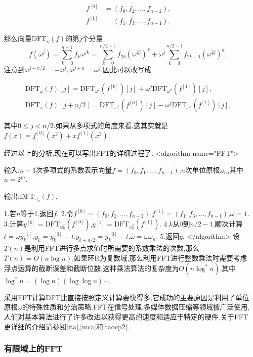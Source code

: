 \documentclass{ctexart}
\newcommand\mtcasCite[1]{[#1]}
\theoremstyle{remark}
\theoremstyle{definition}
\begin{document}
\begin{align*}
f^{[0]}&=(f_0,f_2,\ldots,f_{n-2}),\\
f^{[1]}&=(f_1,f_3,\ldots,f_{n-1}),
\end{align*}

那么向量$\mathrm{DFT}_\omega(f)$的第$j$个分量$$f(\omega^j)=\sum_{k=0}^{n-1}f_k\omega^{jk}=\sum_{k=0}^{n/2-1}f_{2k}(\omega^{2j})^k+\omega^j\sum_{k=0}^{n/2-1}f_{2k+1}(\omega^{2j})^k,$$注意到$\omega^{j+n/2}=-\omega^j,\omega^{j+n}=\omega^j$,因此可以改写成

\begin{align*}
\mathrm{DFT}_\omega(f)[j]=\mathrm{DFT}_{\omega^2}(f^{[0]})[j]+\omega^j\mathrm{DFT}_{\omega^2}(f^{[1]})[j],\\
\mathrm{DFT}_\omega(f)[j+n/2]=\mathrm{DFT}_{\omega^2}(f^{[0]})[j]-\omega^j\mathrm{DFT}_{\omega^2}(f^{[1]})[j],
\end{align*}

其中$0\le j<n/2$.如果从多项式的角度来看,这其实就是$f(x)=f^{[0]}(x^2)+xf^{[ 1]}(x^2)$.

经过以上的分析,现在可以写出FFT的详细过程了.
<algorithm  name="FFT">

输入:$n-1$次多项式的系数表示向量$f=(f_0,f_1,\ldots,f_{n-1})$,$n$次单位原根$\omega_n$,其中$n=2^m$.

输出:$\mathrm{DFT}_{\omega_n}(f)$.

 1.若$n$等于1,返回$f$.
 2.令$f^{[0]}=(f_0,f_2,\ldots,f_{n-2})$,$f^{[ 1]}=(f_1,f_3,\ldots,f_{n-1})$,$\omega=1$.
 3.计算$y^{[0]}=\mathrm{DFT}_{\omega_n^2}(f^{[0]})$,$y^{[ 1]}=\mathrm{DFT}_{\omega_n^2}(f^{[ 1]})$.
 4.$k$从0到$n/2-1$,顺次计算$t=\omega y_k^{[ 1]}$,$y_k=y_k^{[0]}+t$,$y_{k+n/2}=y_k^{[0]}-t$,$\omega=\omega\omega_n$.
 5.返回$y$.
</algorithm>
设$T(n)$是利用FFT进行多点求值时所需要的系数乘法的次数,那么$T(n)=O(n\log{n})$,如果环R为复数域,那么利用FFT进行整数乘法时需要考虑浮点运算的截断误差和截断位数,这种乘法算法的复杂度为$O(n\log^*{n})$,其中$\log^*{n}=(\log{n})(\log{\log{n}})\cdots$.

采用FFT计算DFT比直接按照定义计算要快得多,它成功的主要原因是利用了单位原根$\omega$的特殊性质和分治策略.FFT在信号处理,多媒体数据压缩等领域被广泛使用,人们对基本算法进行了许多改进以获得更高的速度和适应于特定的硬件.关于FFT更详细的介绍请参阅\mtcasCite{ita},\mtcasCite{mca}和\mtcasCite{taocp2}.

\subsubsection{有限域上的FFT}
\end{document}
